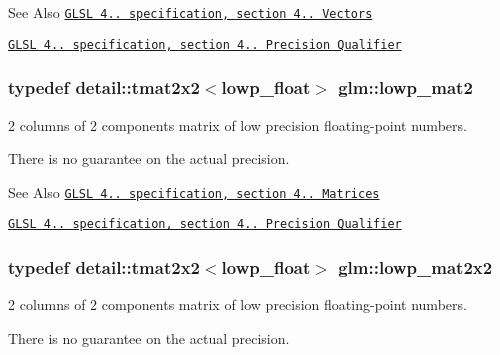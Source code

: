 \begin{DoxySeeAlso}{See Also}
\href{http://www.opengl.org/registry/doc/GLSLangSpec.4.20.8.pdf}{\tt G\-L\-S\-L 4.. specification, section 4.. Vectors} 

\href{http://www.opengl.org/registry/doc/GLSLangSpec.4.20.8.pdf}{\tt G\-L\-S\-L 4.. specification, section 4.. Precision Qualifier} 
\end{DoxySeeAlso}
\hypertarget{group__core__precision_ga403348153f5cd7bd52598be409afdf47}{
\subsubsection[{lowp\-\_\-mat2}]{\setlength{\rightskip}{0pt plus 5cm}typedef detail\-::tmat2x2$<$lowp\-\_\-float$>$ {\bf glm\-::lowp\-\_\-mat2}}}\label{group__core__precision_ga403348153f5cd7bd52598be409afdf47}


2 columns of 2 components matrix of low precision floating-\/point numbers. 

There is no guarantee on the actual precision.

\begin{DoxySeeAlso}{See Also}
\href{http://www.opengl.org/registry/doc/GLSLangSpec.4.20.8.pdf}{\tt G\-L\-S\-L 4.. specification, section 4.. Matrices} 

\href{http://www.opengl.org/registry/doc/GLSLangSpec.4.20.8.pdf}{\tt G\-L\-S\-L 4.. specification, section 4.. Precision Qualifier} 
\end{DoxySeeAlso}
\hypertarget{group__core__precision_gae3f6c672d0fa47ece879f2b1cda7f22b}{
\subsubsection[{lowp\-\_\-mat2x2}]{\setlength{\rightskip}{0pt plus 5cm}typedef detail\-::tmat2x2$<$lowp\-\_\-float$>$ {\bf glm\-::lowp\-\_\-mat2x2}}}\label{group__core__precision_gae3f6c672d0fa47ece879f2b1cda7f22b}


2 columns of 2 components matrix of low precision floating-\/point numbers. 

There is no guarantee on the actual precision.

